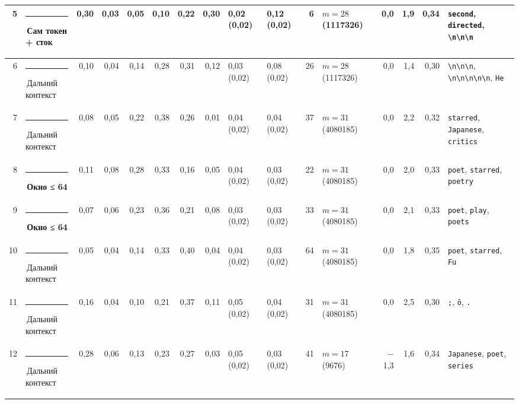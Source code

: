 \documentclass[10pt]{article}
\begin{document}
\begin{minipage}{\linewidth}
\begin{center}
{\begin{tabular}{|r|l|r|r|r|r|r|r|l|l|r|l|r|r|r|l|}
5 & \textcolor[HTML]{2A78D6}{\rule{0.62em}{0.62em}}\,\textbf{Сам токен + сток} & 0,30 & 0,03 & 0,05 & 0,10 & 0,22 & 0,30 & 0,02 (0,02) & 0,12 (0,02) & 6 & $m{=}28$ (1117326) & 0,0 & 1,9 & 0,34 & \texttt{\textvisiblespace{}second}, \texttt{\textvisiblespace{}directed}, \texttt{\textvisiblespace{}\textbackslash{}n\textbackslash{}n\textbackslash{}n} \\ \hline
6 & \textcolor[HTML]{C3C2B7}{\rule{0.62em}{0.62em}}\,Дальний контекст & 0,10 & 0,04 & 0,14 & 0,28 & 0,31 & 0,12 & 0,03 (0,02) & 0,08 (0,02) & 26 & $m{=}28$ (1117326) & 0,0 & 1,4 & 0,30 & \texttt{\textvisiblespace{}\textbackslash{}n\textbackslash{}n\textbackslash{}n}, \texttt{\textbackslash{}n\textbackslash{}n\textbackslash{}n\textbackslash{}n\textbackslash{}n}, \texttt{\textvisiblespace{}He} \\ \hline
7 & \textcolor[HTML]{C3C2B7}{\rule{0.62em}{0.62em}}\,Дальний контекст & 0,08 & 0,05 & 0,22 & 0,38 & 0,26 & 0,01 & 0,04 (0,02) & 0,04 (0,02) & 37 & $m{=}31$ (4080185) & 0,0 & 2,2 & 0,32 & \texttt{\textvisiblespace{}starred}, \texttt{\textvisiblespace{}Japanese}, \texttt{\textvisiblespace{}critics} \\ \hline
8 & \textcolor[HTML]{EDA100}{\rule{0.62em}{0.62em}}\,\textbf{Окно ≤ 64} & 0,11 & 0,08 & 0,28 & 0,33 & 0,16 & 0,05 & 0,04 (0,02) & 0,03 (0,02) & 22 & $m{=}31$ (4080185) & 0,0 & 2,0 & 0,33 & \texttt{\textvisiblespace{}poet}, \texttt{\textvisiblespace{}starred}, \texttt{\textvisiblespace{}poetry} \\ \hline
9 & \textcolor[HTML]{EDA100}{\rule{0.62em}{0.62em}}\,\textbf{Окно ≤ 64} & 0,07 & 0,06 & 0,23 & 0,36 & 0,21 & 0,08 & 0,03 (0,02) & 0,03 (0,02) & 33 & $m{=}31$ (4080185) & 0,0 & 2,1 & 0,33 & \texttt{\textvisiblespace{}poet}, \texttt{\textvisiblespace{}play}, \texttt{\textvisiblespace{}poets} \\ \hline
10 & \textcolor[HTML]{C3C2B7}{\rule{0.62em}{0.62em}}\,Дальний контекст & 0,05 & 0,04 & 0,14 & 0,33 & 0,40 & 0,04 & 0,04 (0,02) & 0,03 (0,02) & 64 & $m{=}31$ (4080185) & 0,0 & 1,8 & 0,35 & \texttt{\textvisiblespace{}poet}, \texttt{\textvisiblespace{}starred}, \texttt{\textvisiblespace{}Fu} \\ \hline
11 & \textcolor[HTML]{C3C2B7}{\rule{0.62em}{0.62em}}\,Дальний контекст & 0,16 & 0,04 & 0,10 & 0,21 & 0,37 & 0,11 & 0,05 (0,02) & 0,04 (0,02) & 31 & $m{=}31$ (4080185) & 0,0 & 2,5 & 0,30 & \texttt{\textvisiblespace{};}, \texttt{ō}, \texttt{\textvisiblespace{}.} \\ \hline
12 & \textcolor[HTML]{C3C2B7}{\rule{0.62em}{0.62em}}\,Дальний контекст & 0,28 & 0,06 & 0,13 & 0,23 & 0,27 & 0,03 & 0,05 (0,02) & 0,03 (0,02) & 41 & $m{=}17$ (9676) & $-$1,3 & 1,6 & 0,34 & \texttt{\textvisiblespace{}Japanese}, \texttt{\textvisiblespace{}poet}, \texttt{\textvisiblespace{}series} \\ \hline

\end{tabular}}
\end{center}
\end{minipage}
\end{document}
